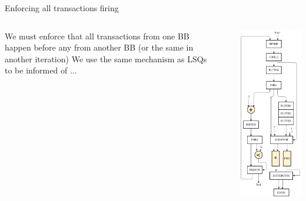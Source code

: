\documentclass{beamer}
\begin{document}
\begin{frame}{Enforcing all transactions firing}
\begin{columns}
    \begin{column}{0.45\textwidth}
    We must enforce that all transactions from one BB happen before any from another BB (or the same in another iteration) \newline \newline
    We use the same mechanism as LSQs to be informed of ...
    \end{column}
    \begin{column}{0.1\textwidth}
    \end{column}
    \begin{column}{0.45\textwidth}
      \includegraphics[scale=0.25]{blocking_shared_solution.png}
    \end{column}
  \end{columns}
\end{frame}
\end{document}
